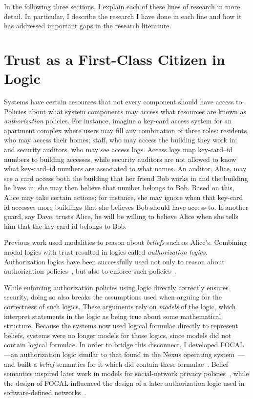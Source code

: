 \documentclass{article}
\theoremstyle{definition}
\begin{document}
In the following three sections, I explain each of these lines of research in more detail.
In particular, I describe the research I have done in each line and how it has addressed important gaps in the research literature.

\section*{Trust as a First-Class Citizen in Logic}

Systems have certain resources that not every component should have access to.
Policies about what system components may access what resources are known as \emph{authorization} policies.
For instance, imagine a key-card access system for an apartment complex where users may fill any combination of three roles: residents, who may access their homes; staff, who may access the building they work in; and security auditors, who may see access logs.
Access logs map key-card--id numbers to building accesses, while security auditors are not allowed to know what key-card--id numbers are associated to what names.
An auditor, Alice, may see a card access both the building that her friend Bob works in and the building he lives in; she may then believe that number belongs to Bob.
Based on this, Alice may take certain actions; for instance, she may ignore when that key-card id accesses more buildings that she believes Bob should have access to.
If another guard, say Dave, trusts Alice, he will be willing to believe Alice when she tells him that the key-card id belongs to Bob.

Previous work used modalities to reason about \emph{beliefs} such as Alice's.
Combining modal logics with trust resulted in logics called \emph{authorization logics}.
Authorization logics have been successfully used not only to reason about authorization policies~\citep{Abadi06}, but also to enforce such policies~\cite{SchneiderWS11,SirerDBRSWWS11}.

While enforcing authorization policies using logic directly correctly ensures security, doing so also breaks the assumptions used when arguing for the correctness of such logics.
These arguments rely on \emph{models} of the logic, which interpret statements in the logic as being true about some mathematical structure.
Because the systems now used logical formulae directly to represent beliefs, systems were no longer models for those logics, since models did not contain logical formulae.
In order to bridge this disconnect, I developed FOCAL---an authorization logic similar to that found in the Nexus operating system~\citep{SchneiderWS11,SirerDBRSWWS11}---and built a \emph{belief} semantics for it which did contain these formulae~\citep{HirschC13}.
Belief semantics inspired later work in models for social-network privacy policies~\cite{PardoS17}, while the design of FOCAL influenced the design of a later authorization logic used in software-defined networks~\citep{SkalkaRDKGDSF19}.
\end{document}
